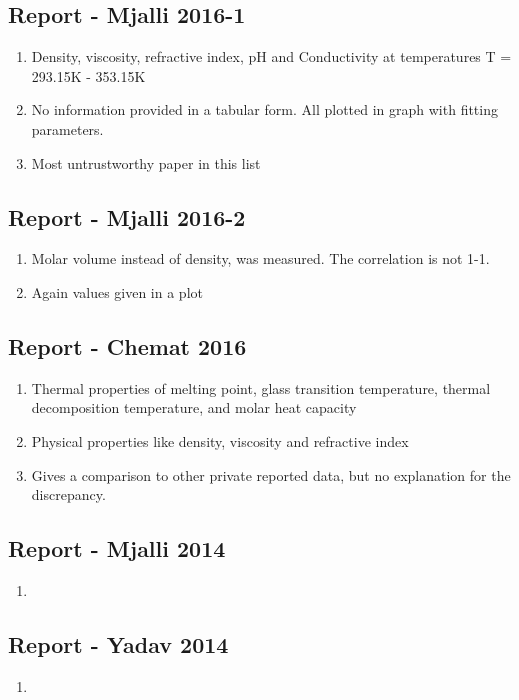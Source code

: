 \documentclass[11pt]{article}
\begin{document}
\subsection{Report - Mjalli 2016-1 \cite{Mjalli2016_1}}
\begin{enumerate}
\item Density, viscosity, refractive index, pH and Conductivity at temperatures T = 293.15K - 353.15K
\item No information provided in a tabular form. All plotted in graph with fitting parameters.
\item Most untrustworthy paper in this list
\end{enumerate}
\subsection{Report - Mjalli 2016-2 \cite{Mjalli2016_2}}
\begin{enumerate}
\item Molar volume instead of density, was measured. The correlation is not 1-1.
\item Again values given in a plot
\end{enumerate}
\subsection{Report - Chemat 2016 \cite{Chemat2016}}
\begin{enumerate}
\item Thermal properties of melting point, glass transition temperature, thermal decomposition temperature, and molar heat capacity
\item Physical properties like density, viscosity and refractive index
\item Gives a comparison to other private reported data, but no explanation for the discrepancy.

\end{enumerate}
\subsection{Report - Mjalli 2014 \cite{Mjalli2014}}
\begin{enumerate}
\item
\end{enumerate}
\subsection{Report - Yadav 2014 \cite{Yadav2014}}
\begin{enumerate}
\item
\end{enumerate}
\end{document}
